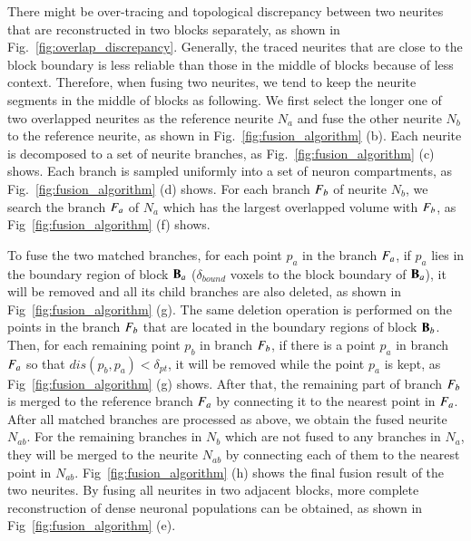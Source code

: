 There might be over-tracing and topological discrepancy between two neurites that are reconstructed in two blocks separately, as shown in Fig.~\ref{fig:overlap_discrepancy}.
Generally, the traced neurites that are close to the block boundary is less reliable than those in the middle of blocks because of less context. 
Therefore, when fusing two neurites, we tend to keep the neurite segments in the middle of blocks as following.
%
We first select the longer one of two overlapped neurites as the reference neurite $N_a$ and fuse the other neurite $N_b$ to the reference neurite, as shown in Fig.~\ref{fig:fusion_algorithm} (b).
%
Each neurite is decomposed to a set of neurite branches, as Fig.~\ref{fig:fusion_algorithm} (c) shows.
Each branch is sampled uniformly into a set of neuron compartments, as Fig.~\ref{fig:fusion_algorithm} (d) shows.
%
For each branch $F_b$ of neurite $N_b$, we search the branch $F_a$ of $N_a$ which has the largest overlapped volume with $F_b$, as Fig~\ref{fig:fusion_algorithm} (f) shows.

To fuse the two matched branches, for each point $p_a$ in the branch $F_a$, if $p_a$ lies in the boundary region of block $\mathbf{B}_a$ ($\delta_{bound}$ voxels to the block boundary of $\mathbf{B}_a$), it will be removed and all its child branches are also deleted, as shown in Fig~\ref{fig:fusion_algorithm} (g).  
The same deletion operation is performed on the points in the branch $F_b$ that are located in the boundary regions of block $\mathbf{B}_b$.
%
Then, for each remaining point $p_b$ in branch $F_b$, if there is a point $p_a$ in branch $F_a$ so that $dis(p_b,p_a)<\delta_{pt}$, it will be removed while the point $p_a$ is kept, as Fig~\ref{fig:fusion_algorithm} (g) shows.
%
After that, the remaining part of branch $F_b$ is merged to the reference branch $F_a$ by connecting it to the nearest point in $F_a$.
After all matched branches are processed as above, we obtain the fused neurite $N_{ab}$.
%
For the remaining branches in $N_b$ which are not fused to any branches in $N_a$, they will be merged to the neurite $N_{ab}$ by connecting each of them to the nearest point in $N_{ab}$.
%
Fig~\ref{fig:fusion_algorithm} (h) shows the final fusion result of the two neurites. 
By fusing all neurites in two adjacent blocks, more complete reconstruction of dense neuronal populations can be obtained, as shown in Fig~\ref{fig:fusion_algorithm} (e).



